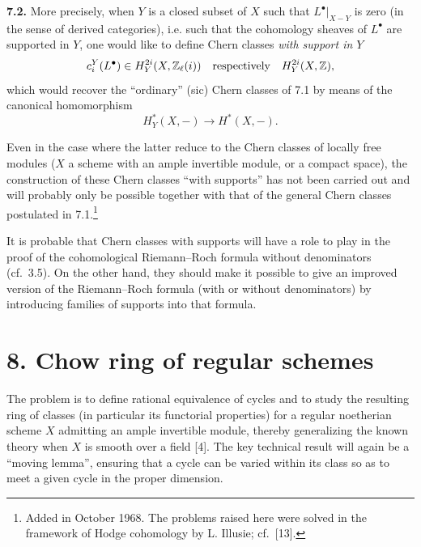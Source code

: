 \noindent\textbf{7.2.}
More precisely, when $Y$ is a closed subset of $X$ such that
$L^\bullet|_{X-Y}$ is zero (in the sense of derived categories), i.e. such
that the cohomology sheaves of $L^\bullet$ are supported in $Y$, one would
like to define Chern classes \emph{with support in $Y$}
\[
 c_i^Y(L^\bullet)\in H_Y^{2i}(X,\mathbb Z_\ell(i))
 \quad\text{respectively}\quad H_Y^{2i}(X,\mathbb Z),
\]
which would recover the ``ordinary'' (sic) Chern classes of 7.1 by means of
the canonical homomorphism
\[
 H_Y^*(X,-)\longrightarrow H^*(X,-).
\]

Even in the case where the latter reduce to the Chern classes of locally
free modules ($X$ a scheme with an ample invertible module, or a compact
space), the construction of these Chern classes ``with supports'' has not
been carried out and will probably only be possible together with that of
the general Chern classes postulated in 7.1.\footnote{Added in October 1968.
The problems raised here were solved in the framework of Hodge cohomology by
L. Illusie; cf.~[13].}

It is probable that Chern classes with supports will have a role to play in
the proof of the cohomological Riemann--Roch formula without denominators
(cf.~3.5). On the other hand, they should make it possible to give an
improved version of the Riemann--Roch formula (with or without denominators)
by introducing families of supports into that formula.

\section*{8. Chow ring of regular schemes}

The problem is to define rational equivalence of cycles and to study the
resulting ring of classes (in particular its functorial properties) for a
regular noetherian scheme $X$ admitting an ample invertible module, thereby
generalizing the known theory when $X$ is smooth over a field [4]. The key
technical result will again be a ``moving lemma'', ensuring that a cycle can
be varied within its class so as to meet a given cycle in the proper
dimension.

